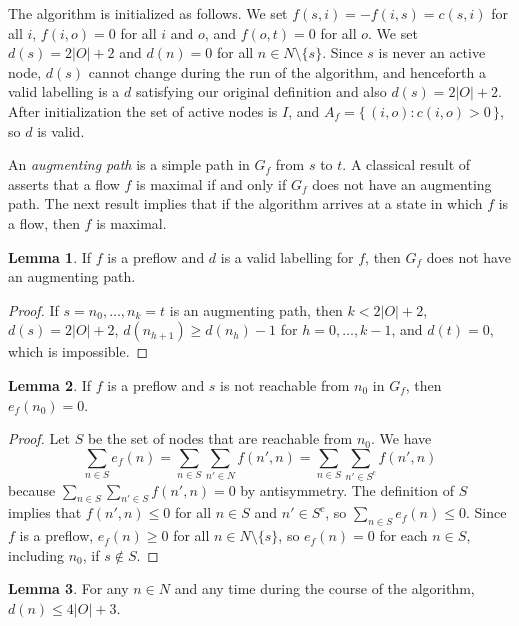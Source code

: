 \documentclass[12pt, A4paper]{article}
\theoremstyle{definition}
\newtheorem{lem}{Lemma}
\begin{document}
The algorithm is initialized as follows.  
We set $f(s,i) = -f(i,s) = c(s,i)$ for all $i$, $f(i,o) = 0$ for all $i$ and $o$, and $f(o,t) = 0$ for all $o$.
We set $d(s) = 2|O| + 2$ and $d(n) = 0$ for all $n \in N \setminus \{s\}$.  Since $s$ is never an active node, $d(s)$ cannot change during the run of the algorithm, and henceforth a valid labelling is a $d$ satisfying our original definition and also $d(s) = 2|O| + 2$.  After initialization the set of active nodes is $I$, and $A_f = \{\, (i,o) : c(i,o) > 0 \,\}$, so $d$ is valid.

An \emph{augmenting path} is a simple path in $G_f$ from $s$ to $t$.  A classical result of \cite{FoFu56} asserts that a flow $f$ is maximal if and only if $G_f$ does not have an augmenting path.  The next result implies that if the algorithm arrives at a state in which $f$ is a flow, then $f$ is maximal.

\begin{lem}
  If $f$ is a preflow and $d$ is a valid labelling for $f$, then $G_f$ does not have an augmenting path.
\end{lem}

\begin{proof}
  If $s = n_0, \ldots, n_k = t$ is an augmenting path, then $k < 2|O| + 2$, $d(s) = 2|O| + 2$,  $d(n_{h+1}) \ge d(n_h) - 1$ for $h = 0, \ldots, k-1$, and $d(t) = 0$, which is impossible.
\end{proof}

\begin{lem}
  If $f$ is a preflow and $s$ is not reachable from $n_0$ in $G_f$, then $e_f(n_0) = 0$.
\end{lem}

\begin{proof}
  Let $S$ be the set of nodes that are reachable from $n_0$.  We have 
  $$\sum_{n \in S} e_f(n) = \sum_{n \in S} \sum_{n' \in N} f(n',n) = \sum_{n \in S} \sum_{n' \in S^c} f(n',n)$$ because $\sum_{n \in S} \sum_{n' \in S} f(n',n) = 0$ by antisymmetry.  The definition of $S$ implies that $f(n',n) \le 0$ for all $n \in S$ and $n' \in S^c$, so $\sum_{n \in S} e_f(n) \le 0$.  Since $f$ is a preflow, $e_f(n) \ge 0$ for all $n \in N \setminus \{s\}$, so $e_f(n) = 0$ for each $n \in S$, including $n_0$,  if $s \notin S$.
\end{proof}

\begin{lem}
  For any $n \in N$ and any time during the course of the algorithm, $d(n) \le 4|O| + 3$.
\end{lem}
\end{document}

